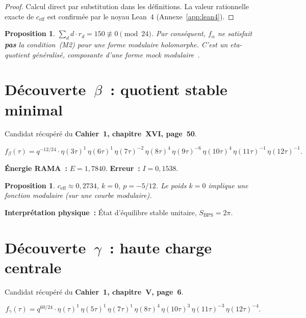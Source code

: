 \documentclass[11pt,a4paper]{article}
\theoremstyle{plain}
\newtheorem{proposition}[theorem]{Proposition}
\theoremstyle{definition}
\newcommand{\ceff}{c_{\mathrm{eff}}}
\begin{document}
\begin{proof}
Calcul direct par substitution dans les définitions.
La valeur rationnelle exacte de $\ceff$ est confirmée
par le noyau Lean~4 (Annexe~\ref{app:lean4}).
\end{proof}

\begin{proposition}
$\sum_d d \cdot r_d = 150 \not\equiv 0 \pmod{24}$.
Par conséquent, $f_\alpha$ ne satisfait \textbf{pas}
la condition~(M2) pour une forme modulaire holomorphe.
C'est un eta-quotient \emph{généralisé}, composante
d'une forme mock modulaire~\cite{zwegers2002,bringmann_ono_2006}.
\end{proposition}

\section{Découverte~$\beta$~: quotient stable minimal}
\label{sec:candidate_beta}

Candidat récupéré du \textbf{Cahier~1, chapitre~XVI, page~50}.

\begin{equation}
  f_\beta(\tau) = q^{-12/24} \cdot
  \eta(3\tau)^{1} \,
  \eta(6\tau)^{1} \,
  \eta(7\tau)^{-2} \,
  \eta(8\tau)^{4} \,
  \eta(9\tau)^{-6} \,
  \eta(10\tau)^{4} \,
  \eta(11\tau)^{-1} \,
  \eta(12\tau)^{-1}.
\end{equation}

\textbf{Énergie RAMA~:} $E = 1{,}7840$. \quad
\textbf{Erreur~:} $I = 0{,}1538$.

\begin{proposition}
$\ceff \approx 0{,}2734$, $k = 0$, $p = -5/12$.
Le poids $k=0$ implique une fonction modulaire
(sur une courbe modulaire).
\end{proposition}

\textbf{Interprétation physique~:} État d'équilibre
stable unitaire, $S_{\mathrm{BPS}} = 2\pi$.

\section{Découverte~$\gamma$~: haute charge centrale}
\label{sec:candidate_gamma}

Candidat récupéré du \textbf{Cahier~1, chapitre~V, page~6}.

\begin{equation}
  f_\gamma(\tau) = q^{60/24} \cdot
  \eta(\tau)^{1} \,
  \eta(5\tau)^{1} \,
  \eta(7\tau)^{1} \,
  \eta(8\tau)^{4} \,
  \eta(10\tau)^{3} \,
  \eta(11\tau)^{-3} \,
  \eta(12\tau)^{-4}.
\end{equation}
\end{document}
